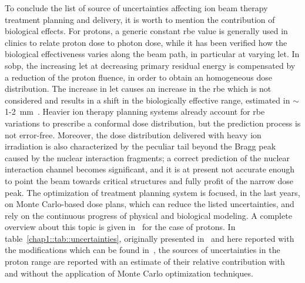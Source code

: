 To conclude the list of source of uncertainties affecting ion beam therapy treatment planning and delivery, it is worth to mention the contribution of biological effects. For protons, a generic constant \gls{rbe} value is generally used in clinics to relate proton dose to photon dose, while it has been verified how the biological effectiveness varies along the beam path, in particular at varying \gls{let}. In \gls{sobp}, the increasing \gls{let} at decreasing primary residual energy is compensated by a reduction of the proton fluence, in order to obtain an homogeneous dose distribution. The increase in \gls{let} causes an increase in the \gls{rbe} which is not considered and results in a shift in the biologically effective range, estimated in $\sim$1-2~mm~\parencite{Paganetti2000, Robertson1975, Wouters1996}. Heavier ion therapy planning systems already account for \gls{rbe} variations to prescribe a conformal dose distribution, but the prediction process is not error-free. Moreover, the dose distribution delivered with heavy ion irradiation is also characterized by the peculiar tail beyond the Bragg peak caused by the nuclear interaction fragments; a correct prediction of the nuclear interaction channel becomes significant, and it is at present not accurate enough to point the beam towards critical structures and fully profit of the narrow dose peak.
The optimization of treatment planning system is focused, in the last years, on Monte Carlo-based dose plans, which can reduce the listed uncertainties, and rely on the continuous progress of physical and biological modeling. A complete overview about this topic is given in~\cite{Paganetti2012} for the case of protons. In table~\ref{chap1::tab::uncertainties}, originally presented in~\cite{Paganetti2012} and here reported with the modifications which can be found in~\cite{Durante2016}, the sources of uncertainties in the proton range are reported with an estimate of their relative contribution with and without the application of Monte Carlo optimization techniques.

